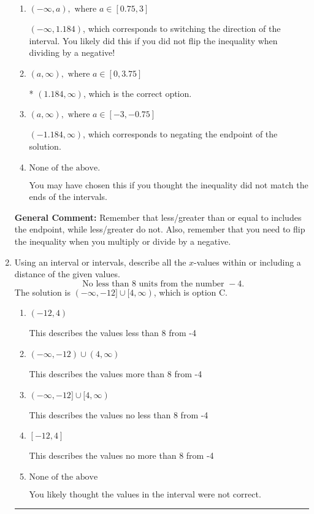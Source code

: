 \documentclass{extbook}[14pt]
\newcommand{\litem}[1]{\item #1

\rule{\textwidth}{0.4pt}}
\begin{document}
\begin{enumerate}
{\begin{enumerate}[label=\Alph*.]
 $(-\infty, -1.184)$, which corresponds to switching the direction of the interval AND negating the endpoint. You likely did this if you did not flip the inequality when dividing by a negative as well as not moving values over to a side properly.
\item \( (-\infty, a), \text{ where } a \in [0.75, 3] \)

 $(-\infty, 1.184)$, which corresponds to switching the direction of the interval. You likely did this if you did not flip the inequality when dividing by a negative!
\item \( (a, \infty), \text{ where } a \in [0, 3.75] \)

* $(1.184, \infty)$, which is the correct option.
\item \( (a, \infty), \text{ where } a \in [-3, -0.75] \)

 $(-1.184, \infty)$, which corresponds to negating the endpoint of the solution.
\item \( \text{None of the above}. \)

You may have chosen this if you thought the inequality did not match the ends of the intervals.
\end{enumerate}

\textbf{General Comment:} Remember that less/greater than or equal to includes the endpoint, while less/greater do not. Also, remember that you need to flip the inequality when you multiply or divide by a negative.
}
\litem{
Using an interval or intervals, describe all the $x$-values within or including a distance of the given values.
\[ \text{ No less than } 8 \text{ units from the number } -4. \]The solution is \( (-\infty, -12] \cup [4, \infty) \), which is option C.\begin{enumerate}[label=\Alph*.]
\item \( (-12, 4) \)

This describes the values less than 8 from -4
\item \( (-\infty, -12) \cup (4, \infty) \)

This describes the values more than 8 from -4
\item \( (-\infty, -12] \cup [4, \infty) \)

This describes the values no less than 8 from -4
\item \( [-12, 4] \)

This describes the values no more than 8 from -4
\item \( \text{None of the above} \)

You likely thought the values in the interval were not correct.
\end{enumerate}

}
\end{enumerate}
\end{document}
